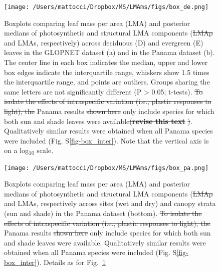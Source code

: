 \documentclass[
  12pt,
  a4paper,
,tablecaptionabove
]{scrartcl}
\providecommand{\DIFaddtex}[1]{{\protect\color{blue}\uwave{#1}}} %
\providecommand{\DIFdeltex}[1]{{\protect\color{red}\sout{#1}}}                      %
\providecommand{\DIFaddFL}[1]{\DIFadd{#1}} %
\providecommand{\DIFdelFL}[1]{\DIFdel{#1}} %
\providecommand{\DIFaddbeginFL}{} %
\providecommand{\DIFaddendFL}{} %
\providecommand{\DIFdelbeginFL}{} %
\providecommand{\DIFdelendFL}{} %
\providecommand{\DIFadd}[1]{\texorpdfstring{\DIFaddtex{#1}}{#1}} %
\providecommand{\DIFdel}[1]{\texorpdfstring{\DIFdeltex{#1}}{}} %
\newcommand{\DIFscaledelfig}{0.5}
\newlength{\DIFdelgraphicswidth} %
\newlength{\DIFdelgraphicsheight} %
\newcommand{\DIFaddincludegraphics}[2][]{{\color{blue}\fbox{\DIFOincludegraphics[#1]{#2}}}} %
\newcommand{\DIFdelincludegraphics}[2][]{%
\sbox{\DIFdelgraphicsbox}{\DIFOincludegraphics[#1]{#2}}%
\settoboxwidth{\DIFdelgraphicswidth}{\DIFdelgraphicsbox} %
\settoboxtotalheight{\DIFdelgraphicsheight}{\DIFdelgraphicsbox} %
\scalebox{\DIFscaledelfig}{%
\parbox[b]{\DIFdelgraphicswidth}{\usebox{\DIFdelgraphicsbox}\\[-\baselineskip] \rule{\DIFdelgraphicswidth}{0em}}\llap{\resizebox{\DIFdelgraphicswidth}{\DIFdelgraphicsheight}{%
\setlength{\unitlength}{\DIFdelgraphicswidth}%
\begin{picture}(1,1)%
\thicklines\linethickness{2pt} %
{\color[rgb]{1,0,0}\put(0,0){\framebox(1,1){}}}%
{\color[rgb]{1,0,0}\put(0,0){\line( 1,1){1}}}%
{\color[rgb]{1,0,0}\put(0,1){\line(1,-1){1}}}%
\end{picture}%
}\hspace*{3pt}}} %
} %
\DeclareRobustCommand{\DIFaddbeginFL}{\DIFOaddbeginFL \let\includegraphics\DIFaddincludegraphics} %
\DeclareRobustCommand{\DIFaddendFL}{\DIFOaddendFL \let\includegraphics\DIFOincludegraphics} %
\DeclareRobustCommand{\DIFdelbeginFL}{\DIFOdelbeginFL \let\includegraphics\DIFdelincludegraphics} %
\DeclareRobustCommand{\DIFdelendFL}{\DIFOaddendFL \let\includegraphics\DIFOincludegraphics} %
\begin{document}
\begin{figure}

{\centering \DIFdelbeginFL %
\DIFdelendFL \DIFaddbeginFL \texttt{[image: /Users/mattocci/Dropbox/MS/LMAms/figs/box\_de.png]}
\DIFaddendFL 

}

\caption{\label{fig-boxplt_de}Boxplots comparing leaf mass per area
(LMA) and posterior medians of photosynthetic and structural LMA
components (\DIFdelbeginFL \DIFdelFL{LMAp }\DIFdelendFL \DIFaddbeginFL \DIFaddFL{LMAm }\DIFaddendFL and LMAs, respectively) across deciduous (D) and
evergreen (E) leaves in the GLOPNET dataset (a) and in the Panama
dataset (b). The center line in each box indicates the median, upper and
lower box edges indicate the interquartile range, whiskers show 1.5
times the interquartile range, and points are outliers. Groups sharing
the same letters are not significantly different (P \textgreater{} 0.05;
t-tests). \DIFdelbeginFL \DIFdelFL{To isolate the effects of intraspecific variation (i.e.,
plastic responses to light), the }\DIFdelendFL \DIFaddbeginFL \DIFaddFL{The }\DIFaddendFL Panama results \DIFdelbeginFL \DIFdelFL{shown here }\DIFdelendFL only include species for which both sun and
shade leaves were available\DIFdelbeginFL \DIFdelFL{(}\textbf{\DIFdelFL{revise this text}}%
\DIFdelFL{)}\DIFdelendFL . Qualitatively similar results were obtained
when all Panama species were included (Fig. S\ref{fig-box_inter}). Note
that the vertical axis is on a log\textsubscript{10} scale.}

\end{figure}

\newpage

\begin{figure}

{\centering \DIFdelbeginFL %
\DIFdelendFL \DIFaddbeginFL \texttt{[image: /Users/mattocci/Dropbox/MS/LMAms/figs/box\_pa.png]}
\DIFaddendFL 

}

\caption{\label{fig-boxplt_pa}Boxplots comparing leaf mass per area
(LMA) and posterior medians of photosynthetic and structural LMA
components (\DIFdelbeginFL \DIFdelFL{LMAp }\DIFdelendFL \DIFaddbeginFL \DIFaddFL{LMAm }\DIFaddendFL and LMAs, respectively across sites (wet and dry) and
canopy strata (sun and shade) in the Panama dataset (bottom). \DIFdelbeginFL \DIFdelFL{To isolate
the effects of intraspecific variation (i.e., plastic responses to
light), the }\DIFdelendFL \DIFaddbeginFL \DIFaddFL{The }\DIFaddendFL Panama
results \DIFdelbeginFL \DIFdelFL{shown here }\DIFdelendFL only include species for which both sun and shade leaves were
available. Qualitatively similar results were obtained when all Panama
species were included (Fig. S\ref{fig-box_inter}). Details as for
Fig.~\ref{fig-boxplt_de}\DIFaddbeginFL \DIFaddFL{.}\DIFaddendFL }

\end{figure}
\end{document}
